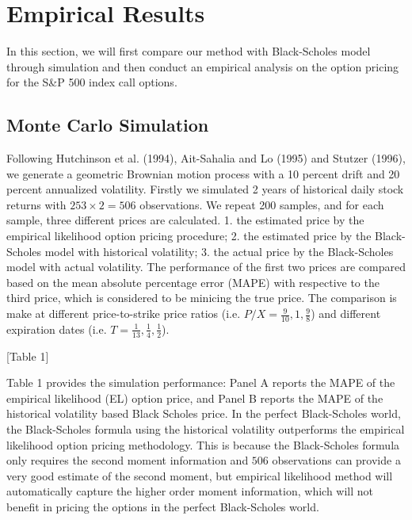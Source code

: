 \section{Empirical Results}
In this section,  we will first compare our method with Black-Scholes model through simulation and then conduct an empirical analysis on the option pricing for the S\&P 500 index call options.  

\subsection{Monte Carlo Simulation}

Following Hutchinson et al. (1994), Ait-Sahalia and Lo (1995) and  Stutzer (1996), we generate a geometric Brownian motion process with a 10 percent drift and 20 percent annualized volatility. Firstly we simulated 2 years of historical daily stock returns with $253\times 2=506$ observations. We repeat 200 samples, and for each sample, three different prices are calculated. 1. the estimated price by the empirical likelihood option pricing procedure; 2. the estimated price by the Black-Scholes model with historical volatility; 3. the actual price by the Black-Scholes model with actual volatility. The performance of the first two prices are compared based on the mean absolute percentage error (MAPE) with respective to the third price, which is considered to be minicing the true price. The comparison is make at different price-to-strike price ratios (i.e. $P/X=\frac{9}{10}, 1, \frac{9}{8}$) and different expiration dates (i.e. $T=\frac{1}{13}, \frac{1}{4}, \frac{1}{2}$). 


\begin{center}
[Table 1]
\end{center}

Table 1 provides the simulation performance: Panel A reports the MAPE of the empirical likelihood (EL) option price, and Panel B reports the MAPE of the historical volatility based Black Scholes price. In the perfect Black-Scholes world, the Black-Scholes formula using the historical volatility outperforms the empirical likelihood option pricing methodology. This is because the Black-Scholes formula only requires the second moment information and $506$ observations can provide a very good estimate of the second moment, but  empirical likelihood method will automatically capture the higher order moment information, which will not benefit in pricing the options in the perfect Black-Scholes world.  

